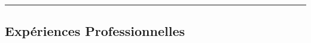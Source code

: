 \documentclass[11pt,a4paper]{article}
\begin{document}
\begin{center}
	{\LARGE \textbf{\cvname}}\\
	\cvlocation
	\vspace{0.05cm}
	\\
	\raisebox{-0.2\height} {\Large \faPhoneSquare} \ \ \cvphone \hfill\raisebox{-0.2\height}{\Large \faEnvelopeSquare} \ \ \cvemail \hfill \raisebox{-0.2\height}{\Large \faGithubSquare} \ \ \cvgithub \hfill \raisebox{-0.2\height}{\Large \faLinkedin} \ \ \cvlinkedin
\end{center}

\hrule
\vspace{-1em}
\subsection*{\Large Expériences Professionnelles}
\end{document}
